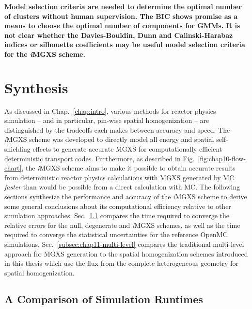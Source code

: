 \begin{emphbox}
\textbf{Model selection criteria are needed to determine the optimal number of clusters without human supervision. The BIC shows promise as a means to choose the optimal number of components for \acp{GMM}. It is not clear whether the Davies-Bouldin, Dunn and Calinski-Harabaz indices or silhouette coefficients may be useful model selection criteria for the \textit{i}\ac{MGXS} scheme.}
\end{emphbox}


\section{Synthesis}
\label{sec:chap11-synthesis}

As discussed in Chap.~\ref{chap:intro}, various methods for reactor physics simulation -- and in particular, pin-wise spatial homogenization -- are distinguished by the tradeoffs each makes between accuracy and speed. The \textit{i}\ac{MGXS} scheme was developed to directly model all energy and spatial self-shielding effects to generate accurate \ac{MGXS} for computationally efficient deterministic transport codes. Furthermore, as described in Fig.~\ref{fig:chap10-flow-chart}, the \textit{i}\ac{MGXS} scheme aims to make it possible to obtain accurate results from deterministic reactor physics calculations with \ac{MGXS} generated by \ac{MC} \textit{faster} than would be possible from a direct calculation with \ac{MC}. The following sections synthesize the performance and accuracy of the \textit{i}\ac{MGXS} scheme to derive some general conclusions about its computational efficiency relative to other simulation approaches. Sec.~\ref{subsec:chap11-runtimes} compares the time required to converge the relative errors for the null, degenerate and \textit{i}\ac{MGXS} schemes, as well as the time required to converge the statistical uncertainties for the reference OpenMC simulations. Sec.~\ref{subsec:chap11-multi-level} compares the traditional multi-level approach for \ac{MGXS} generation to the spatial homogenization schemes introduced in this thesis which use the flux from the complete heterogeneous geometry for spatial homogenization.

\subsection{A Comparison of Simulation Runtimes}
\label{subsec:chap11-runtimes}

